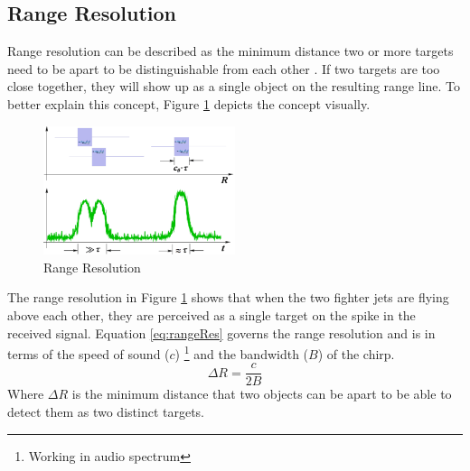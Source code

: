 \subsection{Range Resolution}
Range resolution can be described as the minimum distance two or more targets need to be apart to be distinguishable from each other \cite{noauthor_radar_nodate}. If two targets are too close together, they will show up as a single object on the resulting range line. To better explain this concept, Figure \ref{fig:rangeRes} depicts the concept visually.

\begin{figure}[h!]
    \centering
    \includegraphics[width = 0.5\textwidth]{images/ra1.pdf}
    \caption{Range Resolution \cite{noauthor_radar_nodate}}\label{fig:rangeRes}
\end{figure}

The range resolution in Figure \ref{fig:rangeRes} shows that when the two fighter jets are flying above each other, they are perceived as a single target on the spike in the received signal.
Equation \ref{eq:rangeRes} governs the range resolution and is in terms of the speed of sound ($c$) \footnote{Working in audio spectrum} and the bandwidth ($B$) of the chirp. 
\begin{equation}
\Delta R = \frac{c}{2B}\label{eq:rangeRes}
\end{equation}
Where $\Delta R$ is the minimum distance that two objects can be apart to be able to detect them as two distinct targets.
